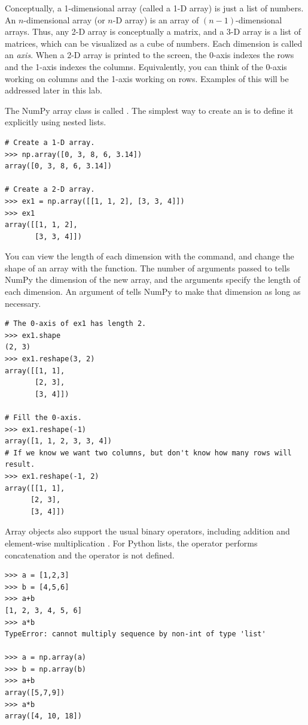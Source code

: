 Conceptually, a 1-dimensional array (called a 1-D array) is just a list of numbers. 
An $n$-dimensional array (or $n$-D array) is an array of $(n-1)$-dimensional arrays. 
Thus, any 2-D array is conceptually a matrix, and a 3-D array is a list of matrices, which can be visualized as a cube of numbers. 
Each dimension is called an \emph{axis}. 
When a 2-D array is printed to the screen, the 0-axis indexes the rows and the 1-axis indexes the columns. Equivalently, you can think of the 0-axis working on columns and the 1-axis working on rows. Examples of this will be addressed later in this lab.

The NumPy array class is called . 
The simplest way to create an  is to define it explicitly using nested lists.
\begin{lstlisting}
# Create a 1-D array.
>>> np.array([0, 3, 8, 6, 3.14])
array([0, 3, 8, 6, 3.14]) 

# Create a 2-D array.
>>> ex1 = np.array([[1, 1, 2], [3, 3, 4]])
>>> ex1
array([[1, 1, 2],
       [3, 3, 4]])

\end{lstlisting} 

You can view the length of each dimension with the  command, and change the shape of an array with the  function. 
The number of arguments passed to  tells NumPy the dimension of the new array, and the arguments specify the length of each dimension. 
An argument of  tells NumPy to make that dimension as long as necessary.
\begin{lstlisting}
# The 0-axis of ex1 has length 2.
>>> ex1.shape
(2, 3)
>>> ex1.reshape(3, 2)
array([[1, 1],
       [2, 3],
       [3, 4]])

# Fill the 0-axis.
>>> ex1.reshape(-1)
array([1, 1, 2, 3, 3, 4])
# If we know we want two columns, but don't know how many rows will result.
>>> ex1.reshape(-1, 2)
array([[1, 1],
      [2, 3],
      [3, 4]])
\end{lstlisting}

Array objects also support the usual binary operators, including addition \li{+} and element-wise multiplication \li{*}. For Python lists, the \li{+} operator performs concatenation and the \li{*} operator is not defined.

\begin{lstlisting}
>>> a = [1,2,3]
>>> b = [4,5,6]
>>> a+b
[1, 2, 3, 4, 5, 6]
>>> a*b
TypeError: cannot multiply sequence by non-int of type 'list'

>>> a = np.array(a)
>>> b = np.array(b)
>>> a+b
array([5,7,9])
>>> a*b
array([4, 10, 18])
\end{lstlisting}


